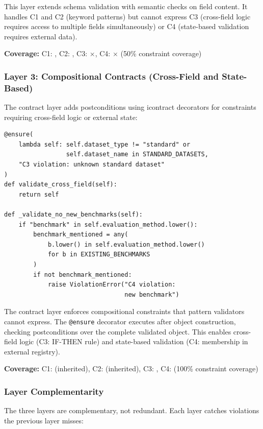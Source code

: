 This layer extends schema validation with semantic checks on field content. It handles C1 and C2 (keyword patterns) but cannot express C3 (cross-field logic requires access to multiple fields simultaneously) or C4 (state-based validation requires external data).

\textbf{Coverage:} C1: \checkmark, C2: \checkmark, C3: $\times$, C4: $\times$ (50\% constraint coverage)

\subsubsection{Layer 3: Compositional Contracts (Cross-Field and State-Based)}

The contract layer adds postconditions using icontract decorators for constraints requiring cross-field logic or external state:

\begin{verbatim}
@ensure(
    lambda self: self.dataset_type != "standard" or
                 self.dataset_name in STANDARD_DATASETS,
    "C3 violation: unknown standard dataset"
)
def validate_cross_field(self):
    return self

def _validate_no_new_benchmarks(self):
    if "benchmark" in self.evaluation_method.lower():
        benchmark_mentioned = any(
            b.lower() in self.evaluation_method.lower()
            for b in EXISTING_BENCHMARKS
        )
        if not benchmark_mentioned:
            raise ViolationError("C4 violation:
                                 new benchmark")
\end{verbatim}

The contract layer enforces compositional constraints that pattern validators cannot express. The \texttt{@ensure} decorator executes after object construction, checking postconditions over the complete validated object. This enables cross-field logic (C3: IF-THEN rule) and state-based validation (C4: membership in external registry).

\textbf{Coverage:} C1: \checkmark (inherited), C2: \checkmark (inherited), C3: \checkmark, C4: \checkmark (100\% constraint coverage)

\subsubsection{Layer Complementarity}

The three layers are complementary, not redundant. Each layer catches violations the previous layer misses:

